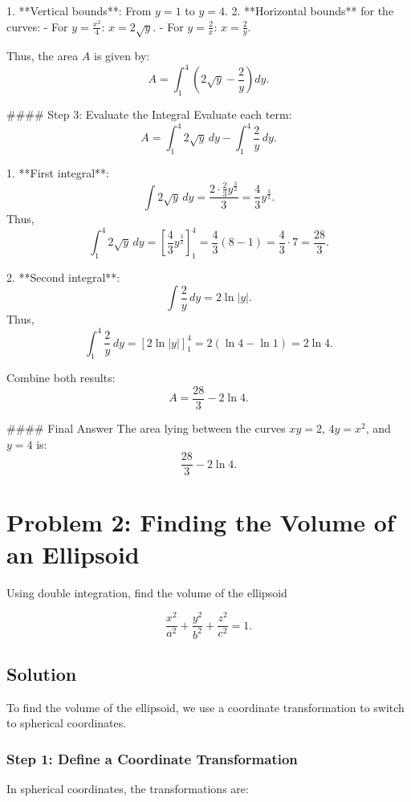 \documentclass{article}
\begin{document}
1. **Vertical bounds**: From \( y = 1 \) to \( y = 4 \).
2. **Horizontal bounds** for the curves:
   - For \( y = \frac{x^2}{4} \): \( x = 2\sqrt{y} \).
   - For \( y = \frac{2}{x} \): \( x = \frac{2}{y} \).

Thus, the area \( A \) is given by:
\[
A = \int_{1}^{4} \left(2\sqrt{y} - \frac{2}{y}\right) dy.
\]

#### Step 3: Evaluate the Integral
Evaluate each term:
\[
A = \int_{1}^{4} 2\sqrt{y} \, dy - \int_{1}^{4} \frac{2}{y} \, dy.
\]

1. **First integral**:
\[
\int 2\sqrt{y} \, dy = \frac{2 \cdot \frac{2}{3}y^{\frac{3}{2}}}{3} = \frac{4}{3} y^{\frac{3}{2}}.
\]
Thus,
\[
\int_{1}^{4} 2\sqrt{y} \, dy = \left[ \frac{4}{3} y^{\frac{3}{2}} \right]_{1}^{4} = \frac{4}{3} \left(8 - 1\right) = \frac{4}{3} \cdot 7 = \frac{28}{3}.
\]

2. **Second integral**:
\[
\int \frac{2}{y} \, dy = 2 \ln |y|.
\]
Thus,
\[
\int_{1}^{4} \frac{2}{y} \, dy = \left[ 2 \ln |y| \right]_{1}^{4} = 2 (\ln 4 - \ln 1) = 2 \ln 4.
\]

Combine both results:
\[
A = \frac{28}{3} - 2 \ln 4.
\]

#### Final Answer
The area lying between the curves \( xy = 2 \), \( 4y = x^2 \), and \( y = 4 \) is:
\[
\boxed{ \frac{28}{3} - 2 \ln 4 }.
\]


\maketitle

\section*{Problem 2: Finding the Volume of an Ellipsoid}
Using double integration, find the volume of the ellipsoid 


\[
\frac{x^2}{a^2} + \frac{y^2}{b^2} + \frac{z^2}{c^2} = 1.
\]



\subsection*{Solution}
To find the volume of the ellipsoid, we use a coordinate transformation to switch to spherical coordinates.

\subsubsection*{Step 1: Define a Coordinate Transformation}
In spherical coordinates, the transformations are:
\end{document}
